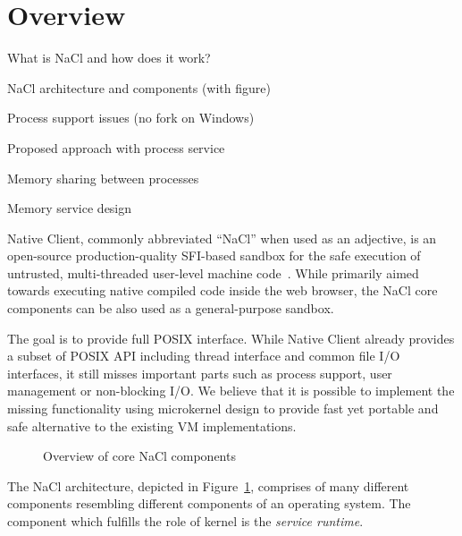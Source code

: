 \section{Overview}
\label{sec:overview}

\begin{structure}
  \item What is NaCl and how does it work?
  \item NaCl architecture and components (with figure)
  \item Process support issues (\eg no fork on Windows)
  \item Proposed approach with process service
  \item Memory sharing between processes
  \item Memory service design
\end{structure}



Native Client, commonly abbreviated ``NaCl'' when used as an adjective,
is an open-source production-quality SFI-based sandbox for the safe
execution of untrusted, multi-threaded user-level machine
code~\cite{yee:ieee-sp09,sehr:usenix-sec10,ansel:pldi11}. While
primarily aimed towards executing native compiled code inside the web
browser, the NaCl core components can be also used as a
general-purpose sandbox.

The goal is to provide full POSIX interface. While Native Client already
provides a subset of POSIX API including thread interface and common
file I/O interfaces, it still misses important parts such as process
support, user management or non-blocking I/O. We believe that it is
possible to implement the missing functionality using microkernel design
to provide fast yet portable and safe alternative to the existing VM
implementations.

\begin{figure}
\centering
\caption{Overview of core NaCl components}
\label{fig:architecture}
\end{figure}

The NaCl architecture, depicted in Figure~\ref{fig:architecture},
comprises of many different components resembling different components
of an operating system. The component which fulfills the role of kernel
is the \emph{service runtime}.

